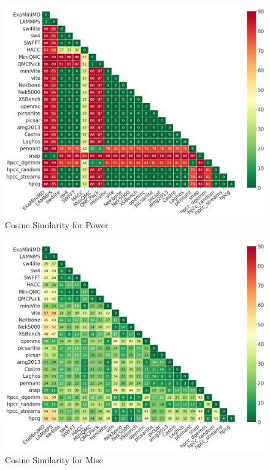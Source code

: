 \begin{figure}[ht]
\centering
\includegraphics[width=0.9\linewidth]{figs/Power.png}
\caption{Cosine Similarity for Power }
\label{figs:cosine Power}
\end{figure}

\begin{figure}[ht]
\centering
\includegraphics[width=0.9\linewidth]{figs/Misc.png}
\caption{Cosine Similarity for Misc }
\label{figs:cosine Misc}
\end{figure}



